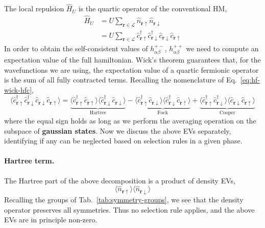 The local repulsion $\hat H_U$ is the quartic operator of the conventional HM,
\[
\begin{aligned}
	\hat H_U &= U \sum_{\mathbf{r}\in\mathcal{L}} \hat n_{\mathbf{r}\uparrow} \hat n_{\mathbf{r}\downarrow} \\
	&= U \sum_{\mathbf{r}\in\mathcal{L}} \hat c_{\mathbf{r}\uparrow}^\dagger \hat c_{\mathbf{r}\downarrow}^\dagger \hat c_{\mathbf{r}\downarrow} \hat c_{\mathbf{r}\uparrow}
\end{aligned}
\]
In order to obtain the self-consistent values of $h_{\alpha\beta}^{+-}$, $h_{\alpha\beta}^{++}$ we need to compute an expectation value of the full hamiltonian. Wick's theorem guarantees that, for the wavefunctions we are using, the expectation value of a quartic fermionic operator is the sum of all fully contracted terms. Recalling the nomenclature of Eq.~\eqref{eq:hf-wick-hfc},
\begin{equation}\label{eq:ehm-HU-wick}
	\langle
		\hat c_{\mathbf{r}\uparrow}^\dagger \hat c_{\mathbf{r}\downarrow}^\dagger \hat c_{\mathbf{r}\downarrow} \hat c_{\mathbf{r}\uparrow}
	\rangle = \underbrace{
		\langle 
		\hat c_{\mathbf{r}\uparrow}^\dagger \hat c_{\mathbf{r}\uparrow}
		\rangle \langle	
		\hat c_{\mathbf{r}\downarrow}^\dagger \hat c_{\mathbf{r}\downarrow} 
		\rangle
	}_{\text{Hartree}}
	- 
	\underbrace{
			\langle 
			\hat c_{\mathbf{r}\uparrow}^\dagger \hat c_{\mathbf{r}\downarrow}
			\rangle \langle	
			\hat c_{\mathbf{r}\downarrow}^\dagger \hat c_{\mathbf{r}\uparrow} 
			\rangle 
		}_{\text{Fock}}
	+ 
	\underbrace{
		\langle 
		\hat c_{\mathbf{r}\uparrow}^\dagger \hat c_{\mathbf{r}\downarrow}^\dagger
		\rangle \langle	
		\hat c_{\mathbf{r}\downarrow} \hat c_{\mathbf{r}\uparrow} 
		\rangle 
	}_{\text{Cooper}}
\end{equation}
where the equal sign holds as long as we perform the averaging operation on the subspace of {\color{tabred}\textbf{gaussian states}}. Now we discuss the above EVs separately, identifying if any can be neglected based on selection rules in a given phase.

\paragraph{Hartree term.} The Hartree part of the above decomposition is a product of density EVs,
\[
	\langle 
		\hat n_{\mathbf{r}\uparrow}
	\rangle \langle	
		\hat n_{\mathbf{r}\downarrow}
	\rangle
\]
Recalling the groups of Tab.~\ref{tab:symmetry-groups}, we see that the density operator preserves all symmetries. Thus no selection rule applies, and the above EVs are in principle non-zero.


